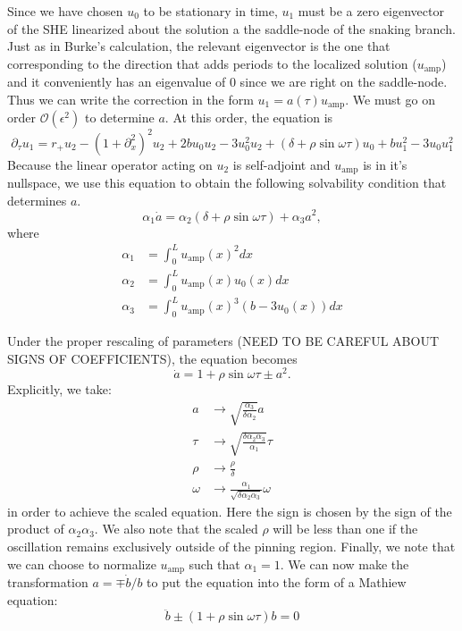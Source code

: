 \documentclass[../main/TimeForcingSHE.tex]{subfiles}
\begin{document}
Since we have chosen $u_0$ to be stationary in time, $u_1$ must be a zero eigenvector of the SHE linearized about the solution a the saddle-node of the snaking branch.  Just as in Burke's calculation, the relevant eigenvector is the one that corresponding to the direction that adds periods to the localized solution ($u_{\text{amp}}$)  and it conveniently has an eigenvalue of 0 since we are right on the saddle-node.  Thus we can write the correction in the form $u_1=a( \tau)u_{\text{amp}}$.
We must go on order  $\mathcal{O}(\epsilon^2)$ to determine $a$.  At this order, the equation is
\begin{equation}
\partial_{\tau} u_1=r_+u_2-\left(1+\partial_{x}^2\right)^2u_2+2b u_0u_2-3u_0^2u_2 +(\delta+\rho \sin\omega \tau )u_0 +bu_1^2- 3u_0 u_1^2 \label{eq:SH}
\end{equation}
Because the linear operator acting on $u_2$ is self-adjoint and $u_{\text{amp}}$ is in it's nullspace, we use this equation to obtain the following solvability condition that determines $a$.  
\begin{equation}
\alpha_1 \dot{a} = \alpha_2 (\delta+\rho\sin\omega  \tau)+\alpha_3 a^2,
\end{equation}
where
\begin{align}
\alpha_1&=\int_0^L u_{\text{amp}}(x)^2 dx\\ \nonumber
\alpha_2&=\int_0^L u_{\text{amp}}(x) u_0(x) dx\\ \nonumber
\alpha_3&=\int_0^L u_{\text{amp}}(x)^3(b- 3u_0(x)) dx
\end{align}

 
Under the proper rescaling of parameters (NEED TO BE CAREFUL ABOUT SIGNS OF COEFFICIENTS), the equation becomes
\begin{equation}
\dot{ a} =  1+\rho\sin \omega\tau  \pm  a^2.
\end{equation}
Explicitly, we take:
\begin{align}
a & \rightarrow \sqrt{\frac{\alpha_3}{\delta \alpha_2}} a\\ \nonumber
\tau &\rightarrow  \sqrt{\frac{\delta \alpha_2 \alpha_3}{\alpha_1}} \tau\\ \nonumber
\rho &\rightarrow \frac{\rho}{\delta}\\ \nonumber
\omega &\rightarrow \frac{\alpha_1}{\sqrt{\delta \alpha_2 \alpha_3}}\omega
\end{align}
in order to achieve the scaled equation.  Here the sign is chosen by the sign of the product of $\alpha_2 \alpha_3$.  We also note that the scaled $\rho$ will be less than one if the oscillation remains exclusively outside of the pinning region.  Finally, we note that we can choose to normalize $u_{\text{amp}}$ such that $\alpha_1=1$.  
We can now make the transformation $a=\mp  \dot{b}/b$ to put the equation into the form of a Mathiew equation:
\begin{equation}
\ddot{b} \pm (1+\rho \sin\omega \tau)b=0
\end{equation}
\end{document}

